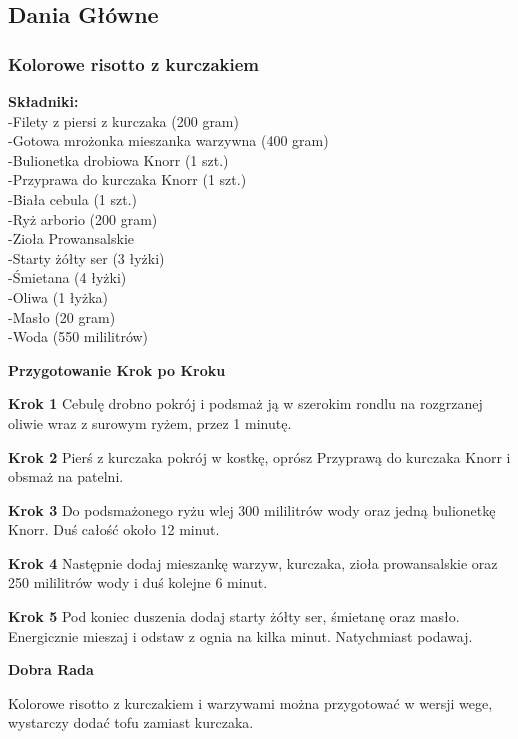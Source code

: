 \documentclass[12pt, letterpaper, titlepage]{article}
\begin{document}
\subsection{Dania Główne}
\subsubsection{Kolorowe risotto z kurczakiem}
\textbf{Składniki:}\\-Filety z piersi z kurczaka (200 gram)\\-Gotowa mrożonka mieszanka warzywna (400 gram)\\-Bulionetka drobiowa Knorr (1 szt.)\\-Przyprawa do kurczaka Knorr (1 szt.)\\-Biała cebula (1 szt.)\\-Ryż arborio (200 gram)\\-Zioła Prowansalskie\\-Starty żółty ser (3 łyżki)\\-Śmietana (4 łyżki)\\-Oliwa (1 łyżka)\\-Masło (20 gram)\\-Woda (550 mililitrów)\\
\begin{center}
\textbf{Przygotowanie Krok po Kroku}
\end{center}

\begin{flushleft}
\textbf{Krok 1}
Cebulę drobno pokrój i podsmaż ją w szerokim rondlu na rozgrzanej oliwie wraz z surowym ryżem, przez 1 minutę.
\end{flushleft}
\begin{flushleft}
\textbf{Krok 2}
Pierś z kurczaka pokrój w kostkę, oprósz Przyprawą do kurczaka Knorr i obsmaż na patelni.
\end{flushleft}
\begin{flushleft}
\textbf{Krok 3}
Do podsmażonego ryżu wlej 300 mililitrów wody oraz jedną bulionetkę Knorr. Duś całość około 12 minut.
\end{flushleft}
\begin{flushleft}
\textbf{Krok 4}
Następnie dodaj mieszankę warzyw, kurczaka, zioła prowansalskie oraz 250 mililitrów wody i duś kolejne 6 minut.
\end{flushleft}
\begin{flushleft}
\textbf{Krok 5}
Pod koniec duszenia dodaj starty żółty ser, śmietanę oraz masło. Energicznie mieszaj i odstaw z ognia na kilka minut. Natychmiast podawaj.

\end{flushleft}
\begin{center}
\textbf{Dobra Rada}
\end{center}
Kolorowe risotto z kurczakiem i warzywami można przygotować w wersji wege, wystarczy dodać tofu zamiast kurczaka. 
\end{document}
